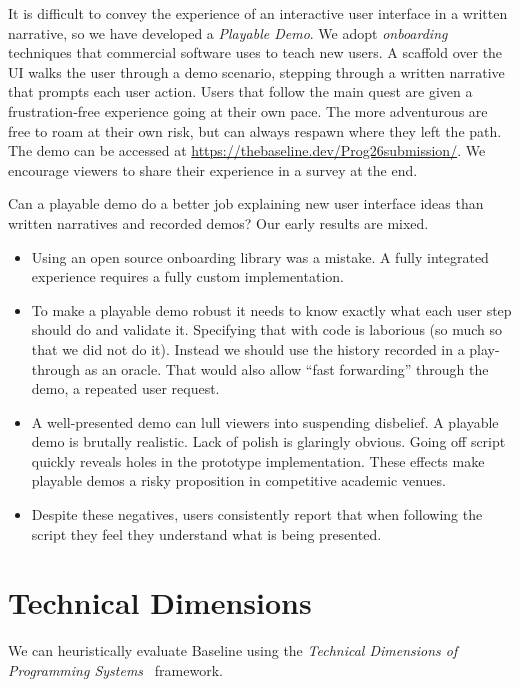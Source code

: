 \documentclass[english,submission]{programming}
\theoremstyle{definition}
\begin{document}
It is difficult to convey the experience of an interactive user interface in a written narrative, so we have developed a \textit{Playable Demo}. We adopt \textit{onboarding} techniques that commercial software uses to teach new users. A scaffold over the UI walks the user through a demo scenario, stepping through a written narrative that prompts each user action. Users that follow the main quest are given a frustration-free experience going at their own pace. The more adventurous are free to roam at their own risk, but can always respawn where they left the path. The demo can be accessed at \url{https://thebaseline.dev/Prog26submission/}. We encourage viewers to share their experience in a survey at the end.

Can a playable demo do a better job explaining new user interface ideas than
written narratives and recorded demos? Our early results are mixed.

\begin{itemize}
\item Using an open source onboarding library was a mistake. A fully integrated experience requires a fully custom implementation.
\item To make a playable demo robust it needs to know exactly what each user step should do and validate it. Specifying that with code is laborious (so much so that we did not do it). Instead we should use the history recorded in a play-through as an oracle. That would also allow ``fast forwarding'' through the demo, a repeated user request.
\item A well-presented demo can lull viewers into suspending disbelief. A playable demo is brutally realistic. Lack of polish is glaringly obvious. Going off script quickly reveals holes in the prototype implementation. These effects make playable demos a risky proposition in competitive academic venues.
\item Despite these negatives, users consistently report that when following the script they feel they understand what is being presented.

\end{itemize}




\section{Technical Dimensions}\label{tech-dims}
We can heuristically evaluate Baseline using the \textit{Technical Dimensions of Programming Systems}~\cite{techdims} framework.
\end{document}
